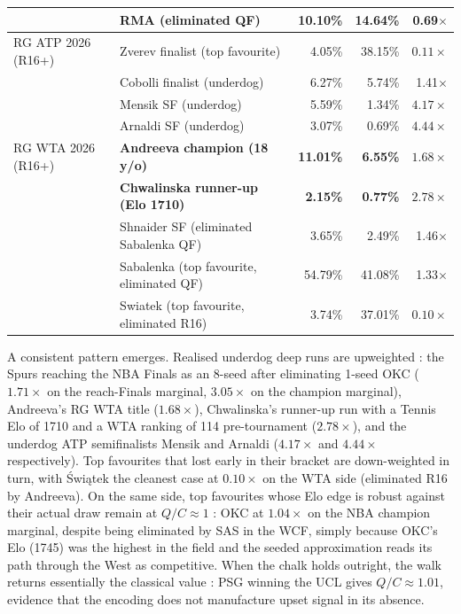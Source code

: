 \documentclass[11pt]{article}
\begin{document}
\begin{table}[!htbp]
\begin{tabular}{llrrr}
                  & RMA (eliminated QF)           & 10.10\% & 14.64\% & 0.69$\times$ \\
\midrule
RG ATP 2026 (R16+) & Zverev finalist (top favourite) & 4.05\% & 38.15\% & $\mathbf{0.11\times}$ \\
                   & Cobolli finalist (underdog)     & 6.27\% & 5.74\% & 1.41$\times$ \\
                   & Mensik SF (underdog)            & 5.59\% & 1.34\% & $\mathbf{4.17\times}$ \\
                   & Arnaldi SF (underdog)           & 3.07\% & 0.69\% & $\mathbf{4.44\times}$ \\
\midrule
RG WTA 2026 (R16+) & \textbf{Andreeva champion (18 y/o)} & \textbf{11.01\%} & \textbf{6.55\%} & $\mathbf{1.68\times}$ \\
                   & \textbf{Chwalinska runner-up (Elo 1710)} & \textbf{2.15\%} & \textbf{0.77\%} & $\mathbf{2.78\times}$ \\
                   & Shnaider SF (eliminated Sabalenka QF) & 3.65\% & 2.49\% & 1.46$\times$ \\
                   & Sabalenka (top favourite, eliminated QF) & 54.79\% & 41.08\% & 1.33$\times$ \\
                   & Swiatek (top favourite, eliminated R16) & 3.74\% & 37.01\% & $\mathbf{0.10\times}$ \\
\bottomrule
\end{tabular}
\end{table}

A consistent pattern emerges. Realised underdog deep runs are
upweighted : the Spurs reaching the NBA Finals as an 8-seed after
eliminating 1-seed OKC ($1.71\times$ on the reach-Finals marginal,
$3.05\times$ on the champion marginal), Andreeva's RG WTA title
($1.68\times$), Chwalinska's runner-up run with a Tennis Elo of
1710 and a WTA ranking of 114 pre-tournament ($2.78\times$), and
the underdog ATP semifinalists Mensik and Arnaldi ($4.17\times$
and $4.44\times$ respectively). Top favourites that lost early in
their bracket are down-weighted in turn, with Świątek the cleanest
case at $0.10\times$ on the WTA side (eliminated R16 by Andreeva).
On the same side, top favourites whose Elo edge is robust against
their actual draw remain at $Q/C \approx 1$ : OKC at $1.04\times$
on the NBA champion marginal, despite being eliminated by SAS in
the WCF, simply because OKC's Elo (1745) was the highest in the
field and the seeded approximation reads its path through the West
as competitive. When the chalk holds outright, the walk returns
essentially the classical value : PSG winning the UCL gives
$Q/C \approx 1.01$, evidence that the encoding does not manufacture
upset signal in its absence.
\end{document}
